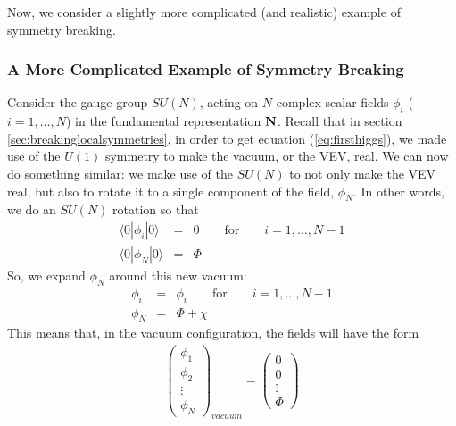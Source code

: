 \documentclass[12pt,epsf]{article}
\def\nolabel{\nonumber }
\def\nolabel{\nonumber }
\begin{document}
Now, we consider a slightly more complicated (and realistic) example of
symmetry breaking.  

\subsubsection{A More Complicated Example of Symmetry Breaking}
\label{sec:morecomplicatedkasdk}

Consider the gauge group $SU(N)$, acting on $N$ complex scalar fields
$\phi_i$ ($i=1,\ldots,N$) in the fundamental representation $\bf N\rm$. 
Recall that in section \ref{sec:breakinglocalsymmetries}, in order to
get equation (\ref{eq:firsthiggs}), we made use of the $U(1)$ symmetry
to make the vacuum, or the VEV, real.  We can now do something
similar: we make use of the $SU(N)$ to not only make the VEV real,
but also to rotate it to a single component of the field, $\phi_N$.  In
other words, we do an $SU(N)$ rotation so that
\begin{eqnarray}
\langle 0 |\phi_i|0\rangle &=& 0 \qquad \mbox{for} \qquad i=1,\ldots,N-1
\nolabel\\
\langle 0 | \phi_N| 0 \rangle &=& \Phi \nolabel
\end{eqnarray}
So, we expand $\phi_N$ around this new vacuum:
\begin{eqnarray}
\phi_i &=& \phi_i \qquad \mbox{for} \qquad i=1,\ldots,N-1 \nolabel\\
\phi_N &=& \Phi + \chi\nolabel
\end{eqnarray}
This means that, in the vacuum configuration, the fields will have the
form
\begin{eqnarray}
\begin{pmatrix}
\phi_1 \\ \phi_2 \\ \vdots \\ \phi_N
\end{pmatrix}_{vacuum} = 
\begin{pmatrix}
0 \\ 0 \\ \vdots \\ \Phi
\end{pmatrix}\nolabel
\end{eqnarray}
\end{document}
